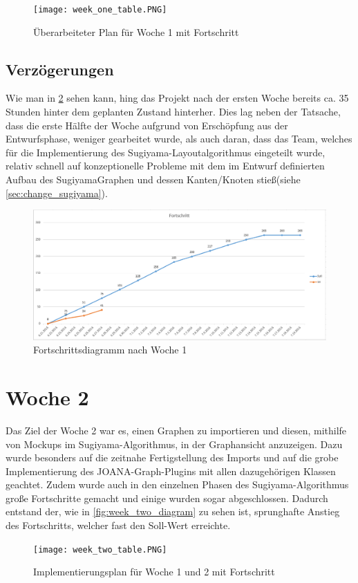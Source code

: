\begin{figure}[!htbp]
	\centering
	\texttt{[image: week\_one\_table.PNG]}
	\caption{Überarbeiteter Plan für Woche 1 mit Fortschritt}
	\label{fig:week_one_table}
\end{figure}

\subsection{Verzögerungen}
Wie man in \ref{fig:week_one_diagram} sehen kann, hing das Projekt nach der ersten Woche bereits ca. 35 Stunden hinter dem geplanten Zustand hinterher.
Dies lag neben der Tatsache, dass die erste Hälfte der Woche aufgrund von Erschöpfung aus der Entwurfsphase, weniger gearbeitet wurde, als auch daran, dass das Team, welches für die Implementierung des Sugiyama-Layoutalgorithmus eingeteilt wurde, relativ schnell auf konzeptionelle Probleme mit dem im Entwurf definierten Aufbau des SugiyamaGraphen und dessen Kanten/Knoten stieß(siehe \ref{sec:change_sugiyama}).

\begin{figure}[!htbp]
	\centering
	\includegraphics[width=380pt]{resourcen/week_one_diagram.PNG}
	\caption{Fortschrittsdiagramm nach Woche 1}
	\label{fig:week_one_diagram}
\end{figure}
\newpage

\section{Woche 2}
Das Ziel der Woche 2 war es, einen Graphen zu importieren und diesen, mithilfe von Mockups im Sugiyama-Algorithmus, in der Graphansicht anzuzeigen.
Dazu wurde besonders auf die zeitnahe Fertigstellung des Imports und auf die grobe Implementierung des JOANA-Graph-Plugins mit allen dazugehörigen Klassen geachtet. Zudem wurde auch in den einzelnen Phasen des Sugiyama-Algorithmus große Fortschritte gemacht und einige wurden sogar abgeschlossen. Dadurch entstand der, wie in \ref{fig:week_two_diagram} zu sehen ist, sprunghafte Anstieg des Fortschritts, welcher fast den Soll-Wert erreichte. 
\begin{figure}[!htbp]
	\centering
	\texttt{[image: week\_two\_table.PNG]}
	\caption{Implementierungsplan für Woche 1 und 2 mit Fortschritt}
	\label{fig:week_two_table}
\end{figure}
